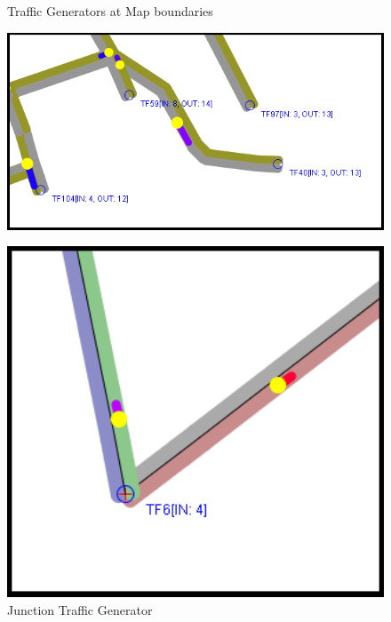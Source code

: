 \begin{figure}[!h]
	\vspace{1.5em}
	\centering
	\begin{minipage}[t]{0.60\textwidth}
  		\caption{Traffic Generators at Map boundaries}
  		\label{fig:boundaryTF}
  		\centering
		\includegraphics[width=1\textwidth]{figs/trafficGenerator/generate-receive.png}
	\end{minipage}\hfill
	\begin{minipage}[t]{0.35\textwidth}
  		\caption{Junction Traffic Generator}
  		\label{fig:junctionTF}
  		\centering
		\includegraphics[width=1\textwidth]{figs/trafficGenerator/inflowOnly.png}
	\end{minipage}
	\vspace{1.5em}
\end{figure}

